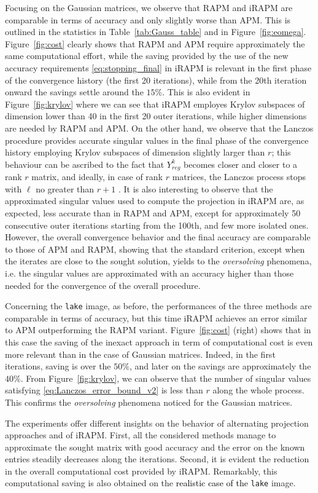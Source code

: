 \documentclass[pdflatex,sn-mathphys-num]{sn-jnl}
\numberwithin{equation}{section}%
\newcommand{\Yck}{{Y_{reg}^k}}
\newcommand{\REV}[1]{\textcolor{black}{#1}}
\theoremstyle{thmstyleone}%
\theoremstyle{thmstyletwo}%
\theoremstyle{thmstylethree}%
\begin{document}
{Focusing on the Gaussian matrices, we observe that  RAPM and iRAPM are comparable in terms of accuracy and only slightly worse than APM. This is outlined in the statistics in Table~\ref{tab:Gauss_table} and in Figure~\ref{fig:eomega}. Figure~\ref{fig:cost} clearly  shows that RAPM and APM require approximately the same computational effort, while the saving provided by the use of the new accuracy requirements \eqref{eq:stopping_final} in iRAPM is relevant in the first phase of the convergence history (the first 20 iterations), while from the 20th iteration onward the savings settle around the $15\%$.
This is also evident in Figure~\ref{fig:krylov}  where we can see that iRAPM employes  Krylov subspaces of dimension  lower than 40 in the first 20 outer iterations, while higher dimensions are needed by RAPM and APM.  
On the other hand, we observe that  the Lanczos procedure  provides accurate singular values in the final phase of the convergence history employing Krylov subspaces of dimension slightly larger than $r$;  this behaviour can be ascribed to the fact that $\Yck$ becomes closer and closer to a rank $r$ matrix, and ideally, in case of rank $r$ matrices, the Lanczos process stops with $\ell$ no greater than $r+1$ \cite{saad2011numerical}.
It is also interesting to observe that the approximated singular values used to compute the projection in iRAPM are, as expected,  less accurate than in RAPM and APM, except for approximately 50 consecutive outer iterations starting from the 100th, and few more isolated ones. However, the overall convergence behavior and the final accuracy are comparable to those of APM and RAPM, showing that the standard criterion, except when the iterates are close to the sought solution, yields to the  
{\it oversolving} phenomena, i.e. the singular values are approximated with an accuracy higher than those needed for the convergence of the overall procedure.}

{Concerning  the \verb*|lake| image, as before, the performances of the three methods are comparable in terms of accuracy, but this time iRAPM achieves an error similar to APM outperforming the RAPM variant.
Figure~\ref{fig:cost} (right) shows that in this case the saving of the inexact approach in term of computational cost  is even more relevant than in the case of Gaussian matrices. Indeed, in the first iterations, saving is over the $50\%$, and later on the savings are approximately the $40\%$. From Figure~\ref{fig:krylov}, we can observe that the number of singular values satisfying \eqref{eq:Lanczos_error_bound_v2} is less than $r$ along the whole process. This confirms the {\it oversolving} phenomena noticed for the Gaussian matrices.

The experiments offer different insights on the behavior of alternating projection approaches and of iRAPM.
First, all the considered methods  manage to approximate the sought matrix with good accuracy and the error on the known  entries steadily decreases along the iterations. 
Second, it is evident the reduction in the overall computational cost provided by iRAPM.
Remarkably, this computational saving  is also obtained  on the \REV{realistic case of the} \verb*|lake| image.}
\end{document}
